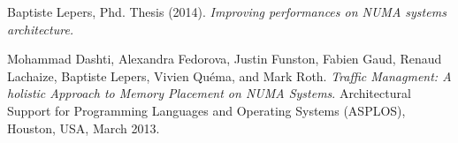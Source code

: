 \begin{thebibliography}{99}

   Baptiste Lepers, Phd. Thesis (2014).
    \newblock \textit{Improving performances on NUMA systems architecture.}
  
   Mohammad Dashti, Alexandra Fedorova, Justin Funston,
    Fabien Gaud, Renaud Lachaize, Baptiste Lepers, Vivien Quéma, and Mark
    Roth.
    \newblock\textit{Traffic Managment: A holistic Approach to Memory
      Placement on NUMA Systems}.
    \newblock Architectural Support for Programming Languages and Operating
    Systems (ASPLOS), Houston, USA, March 2013.

\end{thebibliography}
